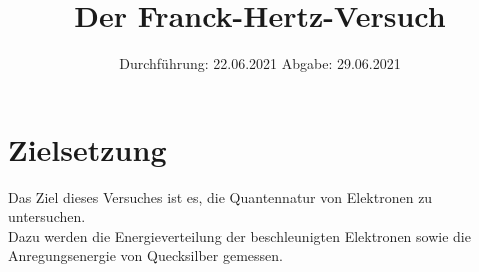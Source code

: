 

\subject{V601}
\title{Der Franck-Hertz-Versuch}
\date{
    Durchführung: 22.06.2021
    \hspace{3em}
    Abgabe: 29.06.2021
}



\maketitle
\thispagestyle{empty}
\tableofcontents
\newpage

\section{Zielsetzung}

    Das Ziel dieses Versuches ist es,
    die Quantennatur von Elektronen zu untersuchen.\\
    Dazu werden die Energieverteilung der beschleunigten Elektronen
    sowie die Anregungsenergie von Quecksilber gemessen.


\clearpage


\clearpage


\clearpage


\clearpage

\printbibliography
\clearpage

\appendix



